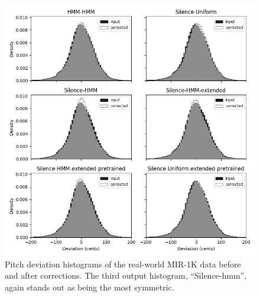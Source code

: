 \begin{figure}[t!]
    \centering
    \includegraphics[width=\columnwidth]{figures/mir-1k-comparison.png}
    \caption{Pitch deviation histograms of the real-world MIR-1K data before and after corrections. The third output histogram, ``Silence-\gls{hmm}'', again stands out as being the most symmetric.}
    \label{fig:mir-1k-comparison}
\end{figure}

